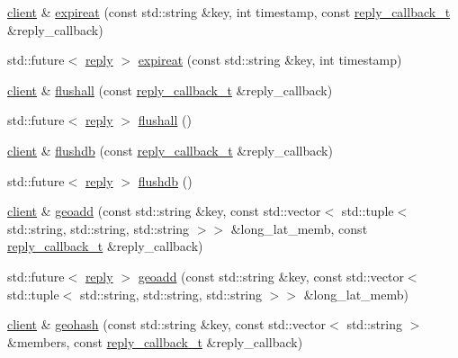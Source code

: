 \begin{DoxyCompactItemize}
\item 
\hyperlink{classcpp__redis_1_1client}{client} \& \hyperlink{classcpp__redis_1_1client_a7b5e1b089d68a0cb71f72fb6aecb0a63}{expireat} (const std\+::string \&key, int timestamp, const \hyperlink{classcpp__redis_1_1client_a061a1140d36d2eaeda82b09a0bb3f9f2}{reply\+\_\+callback\+\_\+t} \&reply\+\_\+callback)
\item 
std\+::future$<$ \hyperlink{classcpp__redis_1_1reply}{reply} $>$ \hyperlink{classcpp__redis_1_1client_af344a8ae784f7d4d529ea9cab276906c}{expireat} (const std\+::string \&key, int timestamp)
\item 
\hyperlink{classcpp__redis_1_1client}{client} \& \hyperlink{classcpp__redis_1_1client_a64e5730ff850ce517709e4e7fc511309}{flushall} (const \hyperlink{classcpp__redis_1_1client_a061a1140d36d2eaeda82b09a0bb3f9f2}{reply\+\_\+callback\+\_\+t} \&reply\+\_\+callback)
\item 
std\+::future$<$ \hyperlink{classcpp__redis_1_1reply}{reply} $>$ \hyperlink{classcpp__redis_1_1client_a78f879507f060ba538de5db80a5e3009}{flushall} ()
\item 
\hyperlink{classcpp__redis_1_1client}{client} \& \hyperlink{classcpp__redis_1_1client_a8334064cd300cb19f0760ad7c4c84673}{flushdb} (const \hyperlink{classcpp__redis_1_1client_a061a1140d36d2eaeda82b09a0bb3f9f2}{reply\+\_\+callback\+\_\+t} \&reply\+\_\+callback)
\item 
std\+::future$<$ \hyperlink{classcpp__redis_1_1reply}{reply} $>$ \hyperlink{classcpp__redis_1_1client_acd8cea192338f42f601ea8fce5c8048c}{flushdb} ()
\item 
\hyperlink{classcpp__redis_1_1client}{client} \& \hyperlink{classcpp__redis_1_1client_acb21c6730ed40799cef06315db231409}{geoadd} (const std\+::string \&key, const std\+::vector$<$ std\+::tuple$<$ std\+::string, std\+::string, std\+::string $>$$>$ \&long\+\_\+lat\+\_\+memb, const \hyperlink{classcpp__redis_1_1client_a061a1140d36d2eaeda82b09a0bb3f9f2}{reply\+\_\+callback\+\_\+t} \&reply\+\_\+callback)
\item 
std\+::future$<$ \hyperlink{classcpp__redis_1_1reply}{reply} $>$ \hyperlink{classcpp__redis_1_1client_a6e4bebc3a7935bd749f2b4a6bfbb6c22}{geoadd} (const std\+::string \&key, const std\+::vector$<$ std\+::tuple$<$ std\+::string, std\+::string, std\+::string $>$$>$ \&long\+\_\+lat\+\_\+memb)
\item 
\hyperlink{classcpp__redis_1_1client}{client} \& \hyperlink{classcpp__redis_1_1client_a37b20a863f276469d12dc47063d56055}{geohash} (const std\+::string \&key, const std\+::vector$<$ std\+::string $>$ \&members, const \hyperlink{classcpp__redis_1_1client_a061a1140d36d2eaeda82b09a0bb3f9f2}{reply\+\_\+callback\+\_\+t} \&reply\+\_\+callback)

\end{DoxyCompactItemize}
